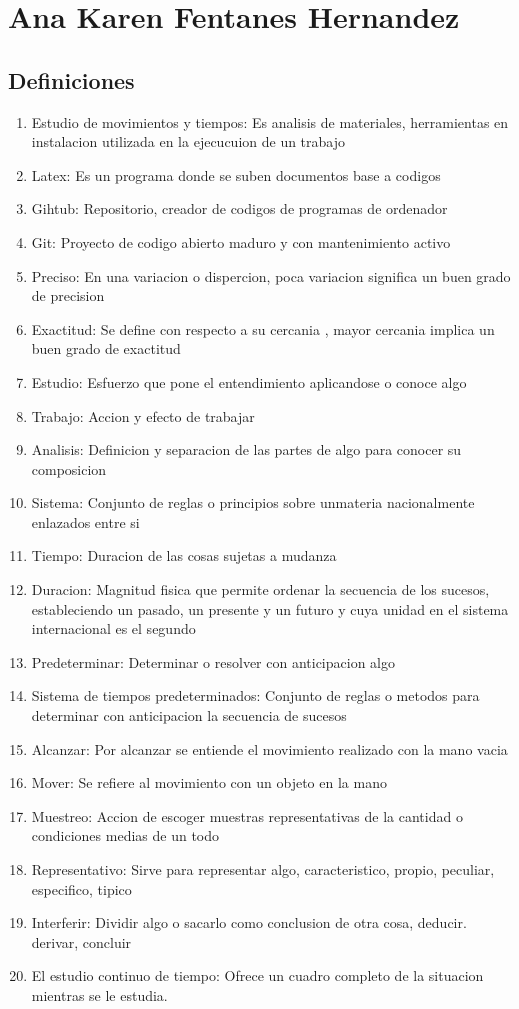 \section{Ana Karen Fentanes Hernandez}
\subsection{Definiciones}

\begin{enumerate}
    \item Estudio de movimientos y tiempos: Es analisis de materiales, herramientas en instalacion utilizada en la ejecucuion de un trabajo
    \item Latex: Es un programa donde se suben documentos base a codigos
    \item Gihtub: Repositorio, creador de codigos de programas de ordenador
    \cite{freecodecamp-2021}
    \item Git: Proyecto de codigo abierto maduro y con mantenimiento activo
    \item Preciso: En una variacion o dispercion, poca variacion significa un buen grado de precision
    \item Exactitud: Se define con respecto a su cercania , mayor cercania implica un buen grado de exactitud 
    \item Estudio: Esfuerzo que pone el entendimiento aplicandose o conoce algo
    \item Trabajo: Accion y efecto de trabajar
    \item Analisis: Definicion y separacion de las partes de algo para conocer su composicion
    \item Sistema: Conjunto de reglas o principios sobre unmateria nacionalmente enlazados entre si
    \item Tiempo: Duracion de las cosas sujetas a mudanza
    \item Duracion: Magnitud fisica que permite ordenar la secuencia de los sucesos, estableciendo un pasado, un presente y un futuro y cuya unidad en el sistema internacional es el segundo
    \item Predeterminar: Determinar o resolver con anticipacion algo
    \cite{Diccionario-02-9}
    \item Sistema de tiempos predeterminados: Conjunto de reglas o metodos para determinar con anticipacion la secuencia de sucesos
    \cite{UPIICSA-2021}
    \item Alcanzar: Por alcanzar se entiende el movimiento realizado con la mano vacia
    \item Mover: Se refiere al movimiento con un objeto en la mano
    \item Muestreo: Accion de escoger muestras representativas de la cantidad o condiciones medias de un todo
    \item Representativo: Sirve para representar algo, caracteristico, propio, peculiar, especifico, tipico
    \item Interferir: Dividir algo o sacarlo como conclusion de otra cosa, deducir. derivar, concluir
    \item El estudio continuo de tiempo: Ofrece un cuadro completo de la situacion mientras se le estudia.
    \cite{Unidad1-06-12}  
\end{enumerate}

